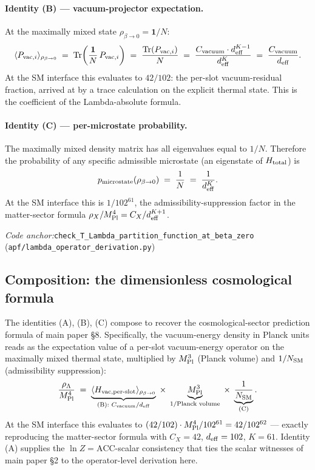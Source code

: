 \documentclass[11pt]{article}
\theoremstyle{plain}
\theoremstyle{definition}
\theoremstyle{remark}
\newcommand{\Mpl}{M_{\rm Pl}}
\newcommand{\coderef}[2]{\par\noindent\textit{Code anchor:}\quad\texttt{#1} (\texttt{#2})}
\begin{document}
\paragraph{Identity (B) --- vacuum-projector expectation.}  At the maximally mixed state $\rho_{\beta \to 0} = \mathbf{1}/N$:
\[
  \langle P_{{\rm vac},i} \rangle_{\rho_{\beta \to 0}}
  \;=\; \mathrm{Tr}\!\left(\frac{\mathbf{1}}{N} \, P_{{\rm vac},i}\right)
  \;=\; \frac{\mathrm{Tr}(P_{{\rm vac},i})}{N}
  \;=\; \frac{C_{\rm vacuum} \cdot d_{\rm eff}^{K-1}}{d_{\rm eff}^K}
  \;=\; \frac{C_{\rm vacuum}}{d_{\rm eff}}.
\]
At the SM interface this evaluates to $42/102$: the per-slot vacuum-residual fraction, arrived at by a trace calculation on the explicit thermal state.  This is the coefficient of the Lambda-absolute formula.

\paragraph{Identity (C) --- per-microstate probability.}  The maximally mixed density matrix has all eigenvalues equal to $1/N$.  Therefore the probability of any specific admissible microstate (an eigenstate of $H_{\rm total}$) is
\[
  p_{\rm microstate}(\rho_{\beta \to 0}) \;=\; \frac{1}{N} \;=\; \frac{1}{d_{\rm eff}^K}.
\]
At the SM interface this is $1/102^{61}$, the admissibility-suppression factor in the matter-sector formula $\rho_X/\Mpl^4 = C_X / d_{\rm eff}^{K+1}$.

\coderef{check\_T\_Lambda\_partition\_function\_at\_beta\_zero}{apf/lambda\_operator\_derivation.py}

\bigskip

\subsection{Composition: the dimensionless cosmological formula}\label{supp:H3}

The identities (A), (B), (C) compose to recover the cosmological-sector prediction formula of main paper \S8.  Specifically, the vacuum-energy density in Planck units reads as the expectation value of a per-slot vacuum-energy operator on the maximally mixed thermal state, multiplied by $\Mpl^3$ (Planck volume) and $1/N_{\rm SM}$ (admissibility suppression):
\[
  \frac{\rho_\Lambda}{\Mpl^4}
  \;=\; \underbrace{\langle H_{\rm vac,per\text{-}slot} \rangle_{\rho_{\beta \to 0}}}_{\text{(B): } C_{\rm vacuum}/d_{\rm eff}}
    \;\times\; \underbrace{\Mpl^3}_{\text{1/Planck volume}}
    \;\times\; \underbrace{\frac{1}{N_{\rm SM}}}_{\text{(C)}}.
\]
At the SM interface this evaluates to $(42/102) \cdot \Mpl^4 / 102^{61} = 42/102^{62}$ --- exactly reproducing the matter-sector formula with $C_X = 42$, $d_{\rm eff} = 102$, $K = 61$.  Identity (A) supplies the $\ln Z = \mathrm{ACC}$-scalar consistency that ties the scalar witnesses of main paper \S2 to the operator-level derivation here.
\end{document}
